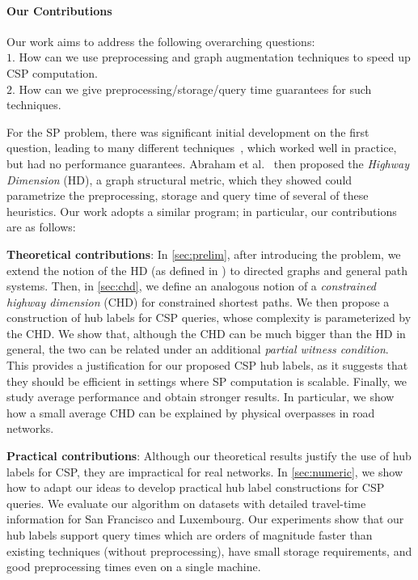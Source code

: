 \paragraph{Our Contributions}
Our work aims to address the following overarching questions:\\
\noindent $1.$ How can we use preprocessing and graph augmentation techniques to speed up CSP computation. \\
\noindent $2.$ How can we give preprocessing/storage/query time guarantees for such techniques.

For the SP problem, there was significant initial development on the first question, leading to many different techniques~\cite{dimacs09}, which worked well in practice, but had no performance guarantees.
Abraham et al.~\cite{highway2013, highway2010} then proposed the \emph{Highway Dimension} (HD), a graph structural metric, which they showed could parametrize the preprocessing, storage and query time of several of these heuristics.
Our work adopts a similar program; in particular, our contributions are as follows:

\textbf{Theoretical contributions}: 
In \cref{sec:prelim}, after introducing the problem, we extend the notion of the HD (as defined in \cite{highway2013}) to directed graphs and general path systems. Then, in \cref{sec:chd}, we define an analogous notion of a \emph{constrained highway dimension} (CHD) for constrained shortest paths. 
We then propose a construction of hub labels for CSP queries, whose complexity is parameterized by the CHD. 
We show that, although the CHD can be much bigger than the HD in general, the two can be related under an additional \emph{partial witness condition}. 
This provides a justification for our proposed CSP hub labels, as it suggests that they should be efficient in settings where SP computation is scalable.
Finally, we study average performance and obtain stronger results. 
In particular, we show how a small average CHD can be explained by physical overpasses in road networks.

\textbf{Practical contributions}: 
Although our theoretical results justify the use of hub labels for CSP, they are impractical for real networks. 
In \cref{sec:numeric}, we show how to adapt our ideas to develop practical hub label constructions for CSP queries. 
We evaluate our algorithm on datasets with detailed travel-time information for San Francisco and Luxembourg.
Our experiments show that our hub labels support query times which are orders of magnitude faster than existing techniques (without preprocessing), have small storage requirements, and good preprocessing times even on a single machine. 


